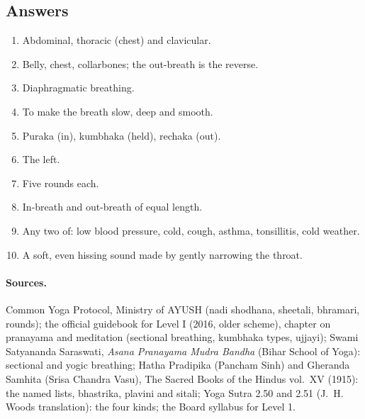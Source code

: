 \subsection*{Answers}
\begin{enumerate}
\item Abdominal, thoracic (chest) and clavicular.
\item Belly, chest, collarbones; the out-breath is the reverse.
\item Diaphragmatic breathing.
\item To make the breath slow, deep and smooth.
\item Puraka (in), kumbhaka (held), rechaka (out).
\item The left.
\item Five rounds each.
\item In-breath and out-breath of equal length.
\item Any two of: low blood pressure, cold, cough, asthma, tonsillitis, cold weather.
\item A soft, even hissing sound made by gently narrowing the throat.
\end{enumerate}

\paragraph{Sources.} Common Yoga Protocol, Ministry of AYUSH (nadi shodhana, sheetali, bhramari, rounds); the official guidebook for Level I (2016, older scheme), chapter on pranayama and meditation (sectional breathing, kumbhaka types, ujjayi); Swami Satyananda Saraswati, \emph{Asana Pranayama Mudra Bandha} (Bihar School of Yoga): sectional and yogic breathing; Hatha Pradipika (Pancham Sinh) and Gheranda Samhita (Srisa Chandra Vasu), The Sacred Books of the Hindus vol.~XV (1915): the named lists, bhastrika, plavini and sitali; Yoga Sutra 2.50 and 2.51 (J.~H. Woods translation): the four kinds; the Board syllabus for Level 1.
